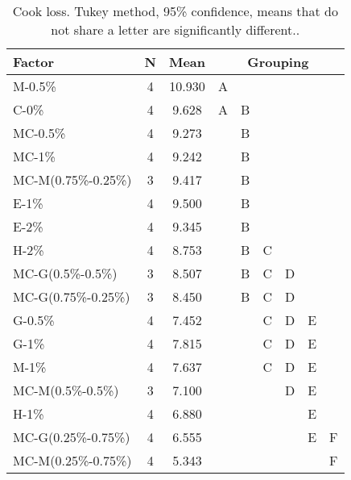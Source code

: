 \begin{table}[H]
    \caption{Cook loss. Tukey method, 95\% confidence, means that do not share a letter are significantly different..}
    \centering
    \begin{tabular}{l|cc|cccccc}
\toprule

\textbf{Factor} & \textbf{N} & \textbf{Mean} & \multicolumn{6}{c}{\textbf{Grouping}} \\

\hline
M-0.5\%	                & 4	        & 10.930	    & A	 	 	&       & & & & \\	 	 
C-0\%	                & 4	        & 9.628	        & A	        & B	 	& & & & \\ 	
MC-0.5\%	            & 4	        & 9.273	 	    &           & B     & & & & \\	 	 	 	 
MC-1\%	                & 4	        & 9.242	 	    &           & B	 	& & & & \\
MC-M(0.75\%-0.25\%)	    & 3	        & 9.417	 	    &           & B	 	& & & & \\ 	 

E-1\%	                & 4	        & 9.500         &           & B     & & & & \\	
E-2\%	                & 4	        & 9.345	 	    &           & B     & & & & \\	 
H-2\%	                & 4	        & 8.753	        &	        & B	    & C	    &       &   & \\

MC-G(0.5\%-0.5\%)	    & 3	        & 8.507	 	    &           & B	    & C	    & D	    &   & \\
MC-G(0.75\%-0.25\%)	    & 3	        & 8.450	        &           & B	    & C	    & D	    &   & \\
G-0.5\%	                & 4	        & 7.452	 	 	&           &       & C	    & D	    & E & \\
G-1\%	                & 4	        & 7.815	 	 	&           &       & C	    & D	    & E & \\
M-1\%	                & 4	        & 7.637	 	 	&           &       & C	    & D	    & E	& \\
MC-M(0.5\%-0.5\%)	    & 3	        & 7.100	 	    & 	 	    &       &       & D	    & E & \\
H-1\%	                & 4	        & 6.880	 	 	&	 	    &       &       &       & E & \\
MC-G(0.25\%-0.75\%)	    & 4	        & 6.555	 	 	&	 	    &       &       &       & E & F \\
MC-M(0.25\%-0.75\%)	    & 4	        & 5.343	 	 	&	 	 	&       &       &       &   & F \\

\bottomrule

    \end{tabular}
    \label{tab:results:CookLoss}
\end{table}

